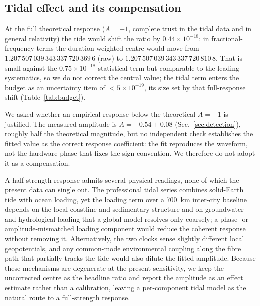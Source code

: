 \documentclass[11pt,a4paper]{article}
\newcommand{\e}[1]{\times 10^{#1}}
\begin{document}



\subsection{Tidal effect and its compensation}
\label{sec:tidal-theory}

At the full theoretical response ($A=-1$, complete trust in the tidal
data and in general relativity) the tide would shift the ratio by
$0.44\e{-18}$: in fractional-frequency terms the duration-weighted centre
would move from $1.207\,507\,039\,343\,337\,720\,369\,6$ (raw) to
$1.207\,507\,039\,343\,337\,720\,810\,8$. That is small against the
$0.75\e{-18}$ statistical term but comparable to the leading systematics,
so we do not correct the central value; the tidal term enters the budget
as an uncertainty item of $<5\e{-19}$, its size set by that full-response
shift (Table~\ref{tab:budget}).

We asked whether an empirical response below the theoretical $A=-1$ is
justified. The measured amplitude is $A=-0.54\pm0.08$
(Sec.~\ref{sec:detection}), roughly half the theoretical magnitude, but
no independent check establishes the fitted value as the correct response
coefficient: the fit reproduces the waveform, not the hardware phase that
fixes the sign convention. We therefore do not adopt it as a compensation.

A half-strength response admits several physical readings, none of which
the present data can single out. The professional tidal series combines
solid-Earth tide with ocean loading, yet the loading term over a
\qty{700}{km} inter-city baseline depends on the local coastline and
sedimentary structure and on groundwater and hydrological loading that a
global model resolves only coarsely; a phase- or amplitude-mismatched
loading component would reduce the coherent response without removing it.
Alternatively, the two clocks sense slightly different local geopotentials,
and any common-mode environmental coupling along the fibre path that
partially tracks the tide would also dilute the fitted amplitude. Because
these mechanisms are degenerate at the present sensitivity, we keep the
uncorrected centre as the headline ratio and report the amplitude as an
effect estimate rather than a calibration, leaving a per-component tidal
model as the natural route to a full-strength response.
\end{document}
